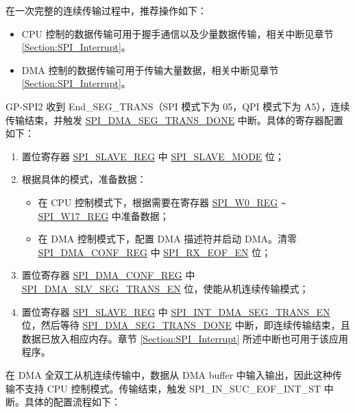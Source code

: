 \documentclass[main\_\_CN.tex]{subfiles}
\begin{document}
在一次完整的连续传输过程中，推荐操作如下：

\begin{itemize}
    \item CPU 控制的数据传输可用于握手通信以及少量数据传输，相关中断见章节 \ref{Section:SPI_Interrupt}。
    \item DMA 控制的数据传输可用于传输大量数据，相关中断见章节 \ref{Section:SPI_Interrupt}。
\end{itemize}

GP-SPI2 收到 End\_SEG\_TRANS（SPI 模式下为 \hexprefix{}05，QPI 模式下为 \hexprefix{}A5），连续传输结束，并触发 \hyperref[fielddesc:SPIDMASEGTRANSDONE]{SPI\_DMA\_SEG\_TRANS\_DONE} 中断。具体的寄存器配置如下：

\begin{enumerate}
    \item 置位寄存器 \hyperref[regdesc:SPISLAVEREG]{SPI\_SLAVE\_REG} 中 \hyperref[fielddesc:SPISLAVEMODE]{SPI\_SLAVE\_MODE} 位；
    \item 根据具体的模式，准备数据：
    \begin{itemize}
        \item  在 CPU 控制模式下，根据需要在寄存器 \hyperref[regdesc:SPIW0REG]{SPI\_W0\_REG} \verb+~+ \hyperref[regdesc:SPIW17REG]{SPI\_W17\_REG} 中准备数据；
         \item 在 DMA 控制模式下，配置 DMA 描述符并启动 DMA。清零 \hyperref[regdesc:SPIDMACONFREG]{SPI\_DMA\_CONF\_REG} 中 \hyperref[fielddesc:SPIRXEOFEN]{SPI\_RX\_EOF\_EN} 位；
    \end{itemize}
    \item 置位寄存器 \hyperref[regdesc:SPIDMACONFREG]{SPI\_DMA\_CONF\_REG} 中 \hyperref[fielddesc:SPIDMASLVSEGTRANSEN]{SPI\_DMA\_SLV\_SEG\_TRANS\_EN} 位，使能从机连续传输模式；
    \item 置位寄存器 \hyperref[regdesc:SPISLAVEREG]{SPI\_SLAVE\_REG} 中 \hyperref[fielddesc:SPIINTDMASEGTRANSEN]{SPI\_INT\_DMA\_SEG\_TRANS\_EN} 位，然后等待 \hyperref[fielddesc:SPIDMASEGTRANSDONE]{SPI\_DMA\_SEG\_TRANS\_DONE} 中断，即连续传输结束，且数据已放入相应内存。章节 \ref{Section:SPI_Interrupt} 所述中断也可用于该应用程序。
\end{enumerate}

在 DMA 全双工从机连续传输中，数据从 DMA buffer 中输入输出，因此这种传输不支持 CPU 控制模式。传输结束，触发 SPI\_IN\_SUC\_EOF\_INT\_ST 中断。具体的配置流程如下：
\end{document}
